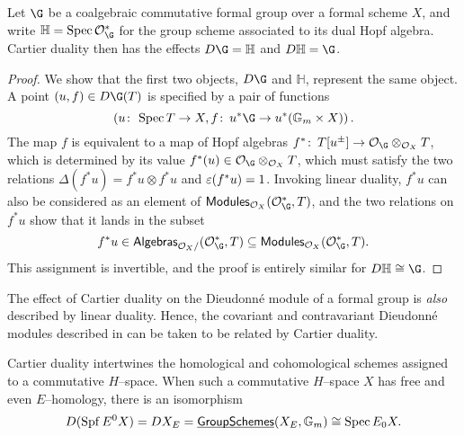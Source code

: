 \begin{lemma}
Let $\G$ be a coalgebraic commutative formal group over a formal scheme $X$, and write $\mathbb H = \Spec \sheaf O_{\G}^*$ for the group scheme associated to its dual Hopf algebra.  Cartier duality then has the effects $D\G = \mathbb H$ and $D\mathbb H = \G$.
\end{lemma}
\begin{proof}
We show that the first two objects, $D\G$ and $\mathbb H$, represent the same object.  A point $(u, f) \in D\G(T)$ is specified by a pair of functions \[\left(u\co \Spec T \to X, f\co u^* \G \to u^*(\Gm \times X)\right).\]  The map $f$ is equivalent to a map of Hopf algebras $f^*\co T[u^\pm] \to \sheaf O_{\G} \otimes_{\sheaf O_X} T$, which is determined by its value $f^*(u) \in \sheaf O_{\G} \otimes_{\sheaf O_X} T$, which must satisfy the two relations $\Delta(f^* u) = f^* u \otimes f^* u$ and $\varepsilon(f^* u) = 1$.  Invoking linear duality, $f^* u$ can also be considered as an element of $\CatOf{Modules}_{\sheaf O_X}(\sheaf O_{\G}^*, T)$, and the two relations on $f^* u$ show that it lands in the subset \[f^* u \in \CatOf{Algebras}_{\sheaf O_X /}(\sheaf O_{\G}^*, T) \subseteq \CatOf{Modules}_{\sheaf O_X}(\sheaf O_{\G}^*, T).\]  This assignment is invertible, and the proof is entirely similar for $D \mathbb H \cong \G$.
\end{proof}

\begin{remark}
The effect of Cartier duality on the Dieudonn\'e module of a formal group is \emph{also} described by linear duality.  Hence, the covariant and contravariant Dieudonn\'e modules described in  can be taken to be related by Cartier duality.
\end{remark}

\begin{remark}\label{TopologicalCartierDuality}
Cartier duality intertwines the homological and cohomological schemes assigned to a commutative $H$--space.  When such a commutative $H$--space $X$ has free and even $E$--homology, there is an isomorphism \[D(\operatorname{Spf} E^0 X) = DX_E = \operatorname{\underline{\smash{\mathsf{GroupSchemes}}}}(X_E, \mathbb G_m) \cong \operatorname{Spec} E_0 X.\]
\end{remark}












